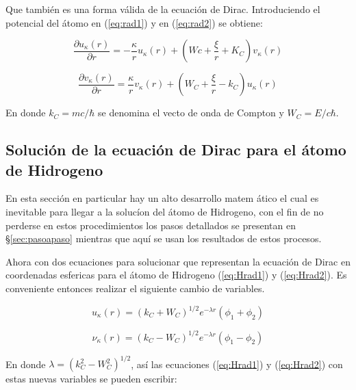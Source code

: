 \documentclass[a4paper, 12pt]{article} %
\begin{document}
Que tambi\'en es una forma v\'alida de la ecuaci\'on de Dirac. Introduciendo 
el potencial del \'atomo en (\ref{eq:rad1}) y en (\ref{eq:rad2}) se 
obtiene:

\begin{equation}\label{eq:Hrad1}
\dfrac{\partial u_{\kappa}(r)}{\partial r} =-\dfrac{\kappa}{r}u_{\kappa}(r)+\left ( Wc+\dfrac{\xi}{r}+K_C \right ) v_{\kappa}(r)
\end{equation}

\begin{equation}\label{eq:Hrad2}
\dfrac{\partial v_{\kappa}(r)}{\partial r} =\dfrac{\kappa}{r}v_{\kappa}(r)+
\left ( W_C + \dfrac{\xi}{r} - k_C \right )u_{\kappa}(r)
\end{equation}

En donde $k_C = mc/\hbar$ se denomina el vecto de onda de Compton y 
$W_C = E / c\hbar$.


\subsection{Soluci\'on de la ecuaci\'on de Dirac para el 
\'atomo de Hidrogeno}\label{sec:solucion} 

En esta secci\'on en particular hay un alto desarrollo matem \'atico 
el cual es inevitable para llegar a la soluc\'ion del \'atomo 
de Hidrogeno, con el fin de no perderse en estos procedimientos
los pasos detallados se presentan en \S \ref{sec:pasoapaso} mientras
que aqu\'i se usan los resultados de estos procesos.
 
Ahora con dos ecuaciones para solucionar que representan  la ecuaci\'on 
de Dirac en coordenadas esfericas para el \'atomo de Hidrogeno
(\ref{eq:Hrad1}) y (\ref{eq:Hrad2}). Es conveniente entonces 
realizar el siguiente cambio de variables.

\begin{equation}\label{eq:cdv}
u_{\kappa}(r) = (k_C + W_C)^{1/2} e^{-\lambda r}(\phi_1 + \phi_2)
\end{equation}

\begin{equation}
\nu_{\kappa}(r) = (k_C - W_C )^{1/2} e^{-\lambda r} (\phi_1 - \phi_2)
\end{equation}

En donde $\lambda = (k_C^2 - W_C^2)^{1/2}$, as\'i las ecuaciones 
(\ref{eq:Hrad1}) y (\ref{eq:Hrad2}) con estas nuevas variables 
se pueden escribir:
\end{document}
